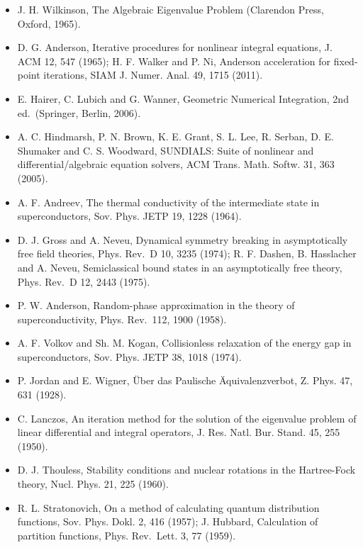 \documentclass[
  10pt,
]{article}
\begin{document}
\begin{itemize}
  L. F. Richardson, The approximate arithmetical solution by finite
  differences of physical problems involving differential equations,
  with an application to the stresses in a masonry dam, Phil. Trans. R.
  Soc. Lond. A 210, 307 (1911).
\item
  J. H. Wilkinson, The Algebraic Eigenvalue Problem (Clarendon Press,
  Oxford, 1965).
\item
  D. G. Anderson, Iterative procedures for nonlinear integral equations,
  J. ACM 12, 547 (1965); H. F. Walker and P. Ni, Anderson acceleration
  for fixed-point iterations, SIAM J. Numer. Anal. 49, 1715 (2011).
\item
  E. Hairer, C. Lubich and G. Wanner, Geometric Numerical Integration,
  2nd ed.~(Springer, Berlin, 2006).
\item
  A. C. Hindmarsh, P. N. Brown, K. E. Grant, S. L. Lee, R. Serban, D. E.
  Shumaker and C. S. Woodward, SUNDIALS: Suite of nonlinear and
  differential/algebraic equation solvers, ACM Trans. Math. Softw. 31,
  363 (2005).
\item
  A. F. Andreev, The thermal conductivity of the intermediate state in
  superconductors, Sov. Phys. JETP 19, 1228 (1964).
\item
  D. J. Gross and A. Neveu, Dynamical symmetry breaking in
  asymptotically free field theories, Phys. Rev.~D 10, 3235 (1974); R.
  F. Dashen, B. Hasslacher and A. Neveu, Semiclassical bound states in
  an asymptotically free theory, Phys. Rev.~D 12, 2443 (1975).
\item
  P. W. Anderson, Random-phase approximation in the theory of
  superconductivity, Phys. Rev.~112, 1900 (1958).
\item
  A. F. Volkov and Sh. M. Kogan, Collisionless relaxation of the energy
  gap in superconductors, Sov. Phys. JETP 38, 1018 (1974).
\item
  P. Jordan and E. Wigner, Über das Paulische Äquivalenzverbot, Z. Phys.
  47, 631 (1928).
\item
  C. Lanczos, An iteration method for the solution of the eigenvalue
  problem of linear differential and integral operators, J. Res. Natl.
  Bur. Stand. 45, 255 (1950).
\item
  D. J. Thouless, Stability conditions and nuclear rotations in the
  Hartree-Fock theory, Nucl. Phys. 21, 225 (1960).
\item
  R. L. Stratonovich, On a method of calculating quantum distribution
  functions, Sov. Phys. Dokl. 2, 416 (1957); J. Hubbard, Calculation of
  partition functions, Phys. Rev.~Lett. 3, 77 (1959).

\end{itemize}
\end{document}
